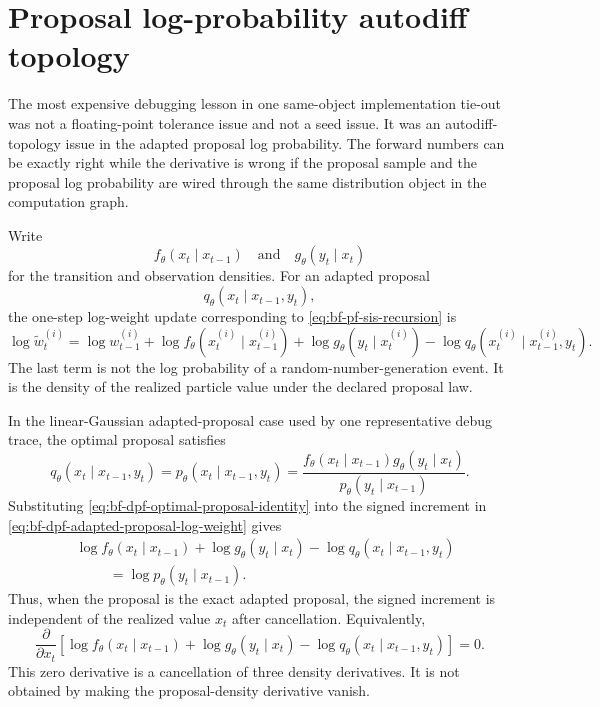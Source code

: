 \section{Proposal log-probability autodiff topology}
\label{sec:bf-dpf-proposal-logprob-ad-topology}

The most expensive debugging lesson in one same-object implementation tie-out
was not a floating-point tolerance issue and not a seed issue.  It was an
autodiff-topology issue in the adapted proposal log probability.  The forward
numbers can be exactly right while the derivative is wrong if the proposal
sample and the proposal log probability are wired through the same distribution
object in the computation graph.

Write
\[
  f_\theta(x_t\mid x_{t-1})
  \quad\text{and}\quad
  g_\theta(y_t\mid x_t)
\]
for the transition and observation densities.  For an adapted proposal
\[
  q_\theta(x_t\mid x_{t-1},y_t),
\]
the one-step log-weight update corresponding to
\eqref{eq:bf-pf-sis-recursion} is
\begin{equation}
\label{eq:bf-dpf-adapted-proposal-log-weight}
  \log \tilde w_t^{(i)}
  =
  \log w_{t-1}^{(i)}
  + \log f_\theta(x_t^{(i)}\mid x_{t-1}^{(i)})
  + \log g_\theta(y_t\mid x_t^{(i)})
  - \log q_\theta(x_t^{(i)}\mid x_{t-1}^{(i)},y_t).
\end{equation}
The last term is not the log probability of a random-number-generation event.
It is the density of the realized particle value under the declared proposal
law.

In the linear-Gaussian adapted-proposal case used by one representative debug
trace, the optimal proposal satisfies
\begin{equation}
\label{eq:bf-dpf-optimal-proposal-identity}
  q_\theta(x_t\mid x_{t-1},y_t)
  =
  p_\theta(x_t\mid x_{t-1},y_t)
  =
  \frac{
    f_\theta(x_t\mid x_{t-1})g_\theta(y_t\mid x_t)
  }{
    p_\theta(y_t\mid x_{t-1})
  } .
\end{equation}
Substituting \eqref{eq:bf-dpf-optimal-proposal-identity} into the signed
increment in \eqref{eq:bf-dpf-adapted-proposal-log-weight} gives
\begin{align}
\label{eq:bf-dpf-optimal-proposal-cancellation}
 &\log f_\theta(x_t\mid x_{t-1})
  + \log g_\theta(y_t\mid x_t)
  - \log q_\theta(x_t\mid x_{t-1},y_t) \nonumber\\
 &\hspace{1cm}
  =
  \log p_\theta(y_t\mid x_{t-1}).
\end{align}
Thus, when the proposal is the exact adapted proposal, the signed increment is
independent of the realized value $x_t$ after cancellation.  Equivalently,
\[
  \frac{\partial}{\partial x_t}
  \left[
    \log f_\theta(x_t\mid x_{t-1})
    + \log g_\theta(y_t\mid x_t)
    - \log q_\theta(x_t\mid x_{t-1},y_t)
  \right]
  =0 .
\]
This zero derivative is a cancellation of three density derivatives.  It is not
obtained by making the proposal-density derivative vanish.

